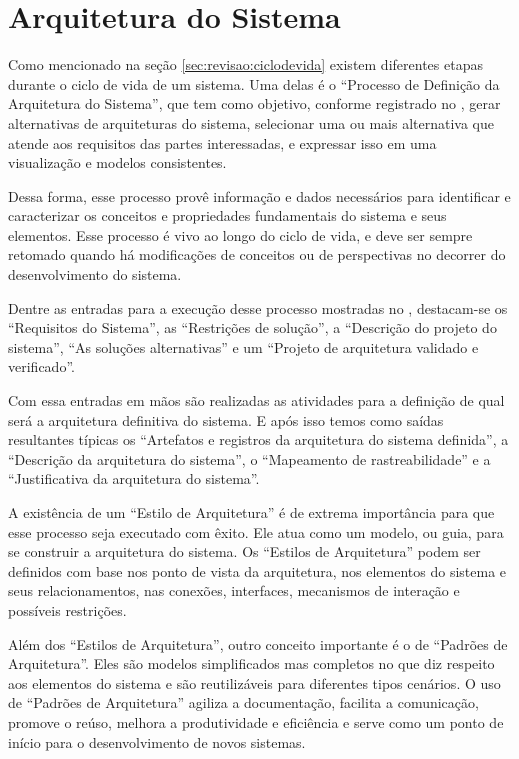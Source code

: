 	\section{Arquitetura do Sistema}\label{sec:revisao:arqSistema}

	Como mencionado na seção \ref{sec:revisao:ciclodevida} existem diferentes etapas durante o ciclo de vida de
	um sistema. Uma delas é o ``Processo de Definição da Arquitetura do Sistema'', que tem como objetivo, conforme registrado
	no \cite{incoseHandbook}, gerar alternativas de arquiteturas do sistema, selecionar uma ou mais alternativa que atende aos
	requisitos das partes interessadas, e expressar isso em uma visualização e modelos consistentes.

	Dessa forma, esse processo provê informação e dados necessários para identificar e caracterizar os conceitos e
	propriedades fundamentais do sistema e seus elementos. Esse processo é vivo ao longo do ciclo de vida, e deve ser sempre
	retomado quando há modificações de conceitos ou de perspectivas no decorrer do desenvolvimento do sistema.

	Dentre as entradas para a execução desse processo mostradas no \cite{incoseHandbook}, destacam-se os ``Requisitos do Sistema'',
	as ``Restrições de solução'', a ``Descrição do projeto do sistema'', ``As soluções alternativas'' e um ``Projeto de arquitetura validado e verificado''.

	Com essa entradas em mãos são realizadas as atividades para a definição de qual será a arquitetura definitiva do sistema. E após
	isso temos como saídas resultantes típicas os ``Artefatos e registros da arquitetura do sistema definida'', a ``Descrição da 
	arquitetura do sistema'', o ``Mapeamento de rastreabilidade'' e a ``Justificativa da arquitetura do sistema''.
	 
	A existência de um ``Estilo de Arquitetura'' é de extrema importância para que esse processo seja executado com êxito.
	Ele	atua como um modelo, ou guia, para se construir a arquitetura do sistema. Os ``Estilos de Arquitetura'' podem 
	ser definidos com base nos ponto de vista da arquitetura, nos elementos do
	sistema e seus relacionamentos, nas conexões, interfaces, mecanismos de interação e possíveis restrições.
	
	Além dos ``Estilos de Arquitetura'', outro conceito importante é o de ``Padrões de Arquitetura''. 
	Eles são modelos simplificados mas completos no que diz respeito aos elementos do
	sistema e são reutilizáveis para diferentes tipos cenários. O uso de ``Padrões de Arquitetura'' agiliza  a 
	documentação, facilita a comunicação, promove o reúso, melhora a produtividade
	e eficiência e serve como um ponto de início para o desenvolvimento de novos sistemas.

